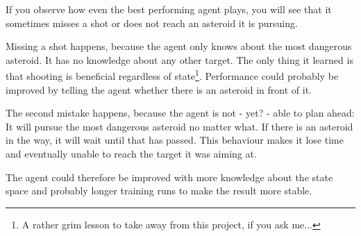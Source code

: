 \documentclass[a4paper,10pt]{article}
\begin{document}
If you observe how even the best performing agent plays, you will see that it sometimes misses a shot or does not reach an asteroid it is pursuing.

Missing a shot happens, because the agent only knows about the most dangerous asteroid.
It has no knowledge about any other target. The only thing it learned is that shooting is beneficial regardless of state\footnote{A rather grim lesson to take away from this project, if you ask me...}.
Performance could probably be improved by telling the agent whether there is an asteroid in front of it.

The second mistake happens, because the agent is not - yet? - able to plan ahead: It will pursue the most dangerous asteroid no matter what. If there is an asteroid in the way, it will wait until that has passed.
This behaviour makes it lose time and eventually unable to reach the target it was aiming at.

The agent could therefore be improved with more knowledge about the state space and probably longer training runs to make the result more stable.




\end{document}
